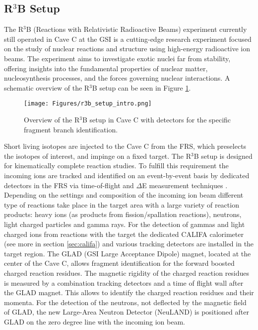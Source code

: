 \subsection{R$^3$B Setup}
The R$^3$B (Reactions with Relativistic Radioactive Beams) experiment currently still operated  in Cave C at the GSI is a cutting-edge research experiment focused on the study of nuclear reactions and structure using high-energy radioactive ion beams. The experiment aims to investigate exotic nuclei far from stability, offering insights into the fundamental properties of nuclear matter, nucleosynthesis processes, and the forces governing nuclear interactions. A schematic overview of the R$^3$B setup can be seen in Figure \ref{fig:r3b_setup_intro}.\newline
\begin{figure}[htpb]
    \centering
    \texttt{[image: Figures/r3b\_setup\_intro.png]}
    \caption{
    Overview of the R$^3$B setup in Cave C with detectors for the specific fragment branch identification.
    } 
    \label{fig:r3b_setup_intro}
\end{figure}
Short living isotopes are injected to the Cave C from the FRS, which preselects the isotopes of interest, and impinge on a fixed target. The R$^3$B setup is designed for kinematically complete reaction studies. To fulfill this requirement the incoming ions are tracked and identified on an event-by-event basis by dedicated detectors in the FRS via time-of-flight and $\Delta$E measurement techniques \cite{nociforo2014time}. Depending on the settings and composition of the incoming ion beam different type of reactions take place in the target area with a large variety of reaction products: heavy ions (as products from fission/spallation reactions), neutrons, light charged particles and gamma rays. For the detection of gammas and light charged ions from reactions with the target the dedicated CALIFA calorimeter (see more in section \ref{sec:califa}) and various tracking detectors are installed in the target region. The GLAD (GSI Large Acceptance Dipole) magnet, located at the center of the Cave C, allows fragment identification for the forward boosted charged reaction residues. The magnetic rigidity of the charged reaction residues is measured by a combination tracking detectors and a time of flight wall after the GLAD magnet. This allows to identify the charged reaction residues and their momenta. For the detection of the neutrons, not deflected by the magnetic field of GLAD, the new Large-Area Neutron Detector (NeuLAND) is positioned after GLAD on the zero degree line with the incoming ion beam.\newline
